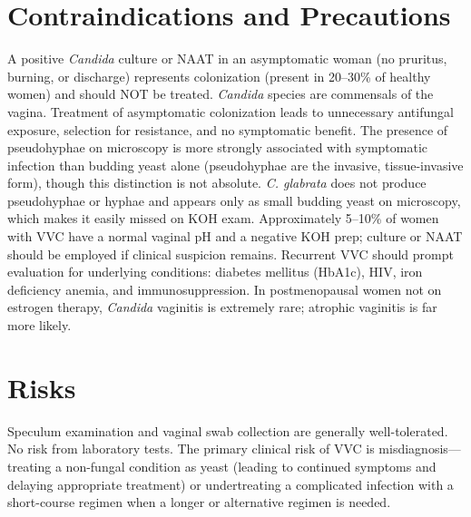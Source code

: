 \section*{Contraindications and Precautions}
A positive \textit{Candida} culture or NAAT in an asymptomatic woman (no pruritus, burning, or discharge) represents colonization (present in 20--30\% of healthy women) and should NOT be treated. \textit{Candida} species are commensals of the vagina. Treatment of asymptomatic colonization leads to unnecessary antifungal exposure, selection for resistance, and no symptomatic benefit. The presence of pseudohyphae on microscopy is more strongly associated with symptomatic infection than budding yeast alone (pseudohyphae are the invasive, tissue-invasive form), though this distinction is not absolute. \textit{C. glabrata} does not produce pseudohyphae or hyphae and appears only as small budding yeast on microscopy, which makes it easily missed on KOH exam. Approximately 5--10\% of women with VVC have a normal vaginal pH and a negative KOH prep; culture or NAAT should be employed if clinical suspicion remains. Recurrent VVC should prompt evaluation for underlying conditions: diabetes mellitus (HbA1c), HIV, iron deficiency anemia, and immunosuppression. In postmenopausal women not on estrogen therapy, \textit{Candida} vaginitis is extremely rare; atrophic vaginitis is far more likely.

\section*{Risks}
Speculum examination and vaginal swab collection are generally well-tolerated. No risk from laboratory tests. The primary clinical risk of VVC is misdiagnosis---treating a non-fungal condition as yeast (leading to continued symptoms and delaying appropriate treatment) or undertreating a complicated infection with a short-course regimen when a longer or alternative regimen is needed.

